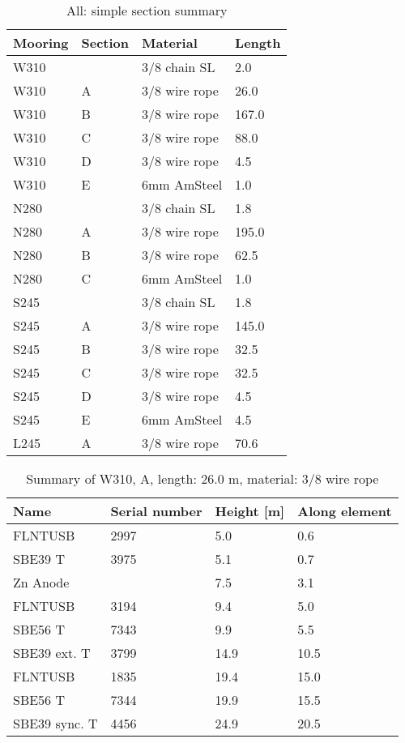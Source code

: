 \documentclass{article}
\begin{document}
\begin{table}[!htbp]
\centering
\caption{All: simple section summary}
\begin{tabular}{llll}
\toprule
Mooring & Section & Material & Length \\
\midrule
W310 &  & 3/8 chain SL & 2.0 \\
W310 & A & 3/8 wire rope & 26.0 \\
W310 & B & 3/8 wire rope & 167.0 \\
W310 & C & 3/8 wire rope & 88.0 \\
W310 & D & 3/8 wire rope & 4.5 \\
W310 & E & 6mm AmSteel & 1.0 \\
N280 &  & 3/8 chain SL & 1.8 \\
N280 & A & 3/8 wire rope & 195.0 \\
N280 & B & 3/8 wire rope & 62.5 \\
N280 & C & 6mm AmSteel & 1.0 \\
S245 &  & 3/8 chain SL & 1.8 \\
S245 & A & 3/8 wire rope & 145.0 \\
S245 & B & 3/8 wire rope & 32.5 \\
S245 & C & 3/8 wire rope & 32.5 \\
S245 & D & 3/8 wire rope & 4.5 \\
S245 & E & 6mm AmSteel & 4.5 \\
L245 & A & 3/8 wire rope & 70.6 \\
\bottomrule
\end{tabular}
\end{table}

\begin{table}[!htbp]
\centering
\caption{Summary of W310, A, length: 26.0 m, material: 3/8 wire rope}
\begin{tabular}{llll}
\toprule
Name & Serial number & Height [m] & Along element \\
\midrule
FLNTUSB & 2997 & 5.0 & 0.6 \\
SBE39 T & 3975 & 5.1 & 0.7 \\
Zn Anode &  & 7.5 & 3.1 \\
FLNTUSB & 3194 & 9.4 & 5.0 \\
SBE56 T & 7343 & 9.9 & 5.5 \\
SBE39 ext. T & 3799 & 14.9 & 10.5 \\
FLNTUSB & 1835 & 19.4 & 15.0 \\
SBE56 T & 7344 & 19.9 & 15.5 \\
SBE39 sync. T & 4456 & 24.9 & 20.5 \\
\bottomrule
\end{tabular}
\end{table}
\end{document}
